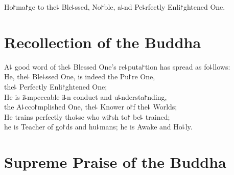 Ho꜓ma꜓ge to the꜕ Ble꜕ssed, No꜓ble, a꜕nd Pe꜕rfectly Enli꜓ghtened One.


\nextChapterUseDelegatedPageNumber

\chapter{Recollection of the Buddha}

\begin{leader}
\end{leader}

A꜕ good word of the꜕ Blessed One's re꜕puta꜓tion has spread as fo꜕llows:\\
He, the꜕ Ble꜕ssed One, is indeed the Pu꜓re One,\\
\vin the꜕ Perfectly Enli꜓ghtened One;\\
He is i꜕mpeccable i꜕n conduct and u꜕ndersta꜓nding,\\
\vin the A꜕cco꜓mplished One, the꜕ Knower o꜓f the꜕ Worlds;\\
He trains perfectly tho꜕se who wi꜓sh to꜓ be꜕ trained;\\
\vin he is Teacher of go꜓ds and hu꜕mans; he is Awake and Ho꜕ly.

\clearpage

\chapter*{Supreme Praise of the Buddha}

\delegateSetUseNext

\begin{leader}
\end{leader}

